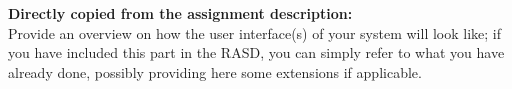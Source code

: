 \textbf{Directly copied from the assignment description:} \\
Provide an overview on how the user interface(s) of your system will look like; if you have included this part in the RASD, you can simply refer to what you have already done, possibly providing here some extensions if applicable.